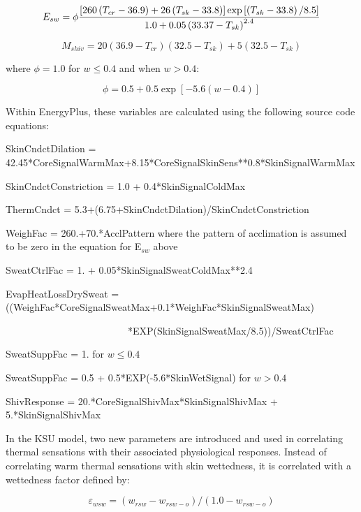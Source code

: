 \begin{equation}
E_{sw} = \phi \frac{\left[260\left(T_{cr} - 36.9\right) + 26\left(T_{sk} - 33.8\right)\right] \exp\left[\left(T_{sk} - 33.8\right)/8.5\right]}{1.0 + 0.05\left(33.37 - T_{sk}\right)^{2.4}}
\end{equation}

\begin{equation}
{M_{shiv}} = 20(36.9 - {T_{cr}})(32.5 - {T_{sk}}) + 5(32.5 - {T_{sk}})
\end{equation}

where \(\phi = 1.0\) for \(w \le 0.4\) and when \(w > 0.4\):

\begin{equation}
\phi = 0.5 + 0.5\exp [ - 5.6(w - 0.4)]
\end{equation}

Within EnergyPlus, these variables are calculated using the following source code equations:

SkinCndctDilation = 42.45*CoreSignalWarmMax+8.15*CoreSignalSkinSens**0.8*SkinSignalWarmMax

SkinCndctConstriction = 1.0 + 0.4*SkinSignalColdMax

ThermCndct = 5.3+(6.75+SkinCndctDilation)/SkinCndctConstriction

WeighFac = 260.+70.*AcclPattern where the pattern of acclimation is assumed to be zero in the equation for E\(_{sw}\) above

SweatCtrlFac = 1. + 0.05*SkinSignalSweatColdMax**2.4

EvapHeatLossDrySweat = ((WeighFac*CoreSignalSweatMax+0.1*WeighFac*SkinSignalSweatMax)

~~~~~~~~~~~~~~~~~~~~~~~~~*EXP(SkinSignalSweatMax/8.5))/SweatCtrlFac

SweatSuppFac = 1. for \(w \le 0.4\)

SweatSuppFac = 0.5 + 0.5*EXP(-5.6*SkinWetSignal) for \(w > 0.4\)

ShivResponse = 20.*CoreSignalShivMax*SkinSignalShivMax + 5.*SkinSignalShivMax

In the KSU model, two new parameters are introduced and used in correlating thermal sensations with their associated physiological responses. Instead of correlating warm thermal sensations with skin wettedness, it is correlated with a wettedness factor defined by:

\begin{equation}
{\varepsilon_{wsw}} = ({w_{rsw}} - {w_{rsw - o}})/(1.0 - {w_{rsw - o}})
\end{equation}

